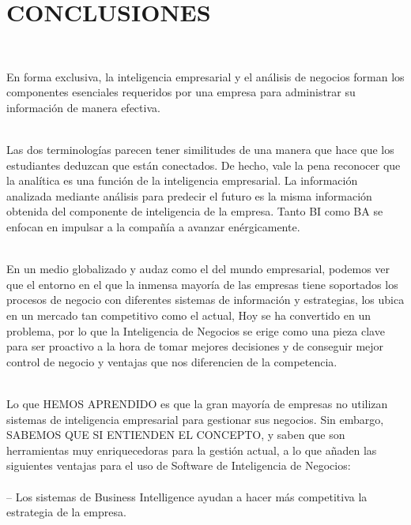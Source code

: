 \section{CONCLUSIONES} 
\begin{flushleft}
\textbf{}\\


\item En forma exclusiva, la inteligencia empresarial y el análisis de negocios forman los componentes esenciales requeridos por una empresa para administrar su información de manera efectiva.\textbf{}\\
\textbf{}\\
\item 
Las dos terminologías parecen tener similitudes de una manera que hace que los estudiantes deduzcan que están conectados. De hecho, vale la pena reconocer que la analítica es una función de la inteligencia empresarial. La información analizada mediante análisis para predecir el futuro es la misma información obtenida del componente de inteligencia de la empresa. Tanto BI como BA se enfocan en impulsar a la compañía a avanzar enérgicamente.\textbf{}\\
\textbf{}\\
\item En un medio globalizado y audaz como el del mundo empresarial, podemos ver que el entorno en el que la inmensa mayoría de las empresas tiene soportados los procesos de negocio con diferentes sistemas de información y estrategias, los ubica en un mercado tan competitivo como el actual, Hoy se ha convertido en un problema, por lo que la Inteligencia de Negocios se erige como una pieza clave para ser proactivo a la hora de tomar mejores decisiones y de conseguir mejor control de negocio y ventajas que nos diferencien de la competencia.\textbf{}\\
\textbf{}\\
\item Lo que HEMOS APRENDIDO es que la gran mayoría de empresas no utilizan sistemas de inteligencia empresarial para gestionar sus negocios. Sin embargo, SABEMOS QUE SI ENTIENDEN EL CONCEPTO, y saben que son herramientas muy enriquecedoras para la gestión actual, a lo que añaden las siguientes ventajas para el  uso de Software de Inteligencia de Negocios: 
\textbf{}\\
\textbf{}\\
 – Los sistemas de Business Intelligence ayudan a hacer más competitiva la estrategia de la empresa.\textbf{}\\


\end{flushleft}
